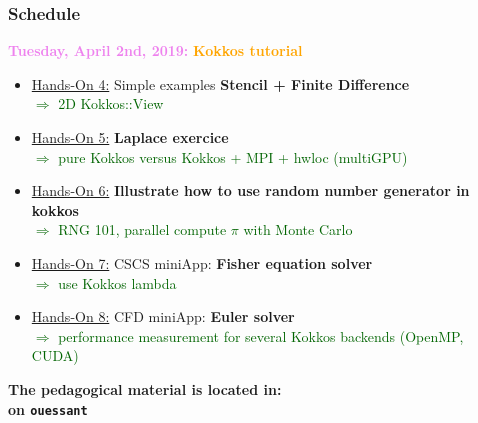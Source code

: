 \begin{frame}
  \frametitle{Schedule}

  {\bf \large \textcolor{violet}{Tuesday, April 2nd, 2019:}} \textcolor{orange}{\bf Kokkos tutorial}
  \begin{itemize}
  \item \textcolor{blue}{\hyperlink{handson4}{Hands-On 4:}} Simple examples \textbf{Stencil + Finite Difference}\\
    \textcolor{darkgreen}{$\Rightarrow$ 2D Kokkos::View}
  \item \textcolor{blue}{\hyperlink{handson5}{Hands-On 5:}} \textbf{Laplace exercice}\\
    \textcolor{darkgreen}{$\Rightarrow$ pure Kokkos versus Kokkos + MPI + hwloc (multiGPU)}
  \item \textcolor{blue}{\hyperlink{handson6}{Hands-On 6:}} \textbf{Illustrate how to use random number generator in kokkos}\\
    \textcolor{darkgreen}{$\Rightarrow$ RNG 101, parallel compute $\pi$ with Monte Carlo}
  \item \textcolor{blue}{\hyperlink{handson7}{Hands-On 7:}} CSCS miniApp: \textbf{Fisher equation solver}\\
    \textcolor{darkgreen}{$\Rightarrow$ use Kokkos lambda}
  \item \textcolor{blue}{\hyperlink{handson8}{Hands-On 8:}} CFD miniApp: \textbf{Euler solver}\\
    \textcolor{darkgreen}{$\Rightarrow$ performance measurement for several Kokkos backends (OpenMP, CUDA)}
  \end{itemize}

  \vfill
  {\bf The pedagogical material is located in:\\
   on \texttt{ouessant}}

\end{frame}
